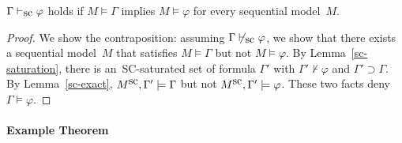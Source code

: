 \begin{theorem}
 \label{sc-comp}
$\Gamma\vdash_{\mbox{\rm sc}}\varphi$ holds if $M\models \Gamma$ implies $M\models\varphi$ for every
 sequential model~$M$.
\end{theorem}
\begin{proof}
 We show the contraposition: assuming $\Gamma\not\vdash_{\mbox{\rm sc}}\varphi$, we show
 that there exists a sequential model~$M$ that satisfies
 $M\models\Gamma$ but not $M\models\varphi$.
 By Lemma~\ref{sc-saturation},
 there is an~SC-saturated set of formula $\Gamma'$ with $\Gamma'\not\vdash\varphi$
 and $\Gamma'\supset\Gamma$.
 By Lemma~\ref{sc-exact},
 $M^{\mbox{sc}}, \Gamma'\models \Gamma$ but not $M^{\mbox{sc}}, \Gamma' \models \varphi$.
 These two facts deny $\Gamma\models\varphi$.
\end{proof}



\paragraph{Example Theorem}

